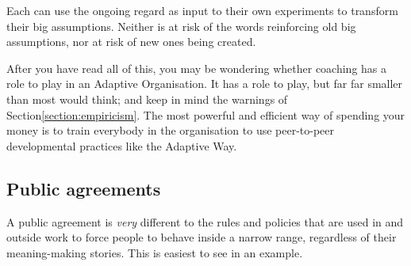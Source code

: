 Each can use the ongoing regard as input to their own experiments to transform their big assumptions. Neither is at risk of the words reinforcing old big assumptions, nor at risk of new ones being created. 


After you have read all of this, you may be wondering whether coaching has a role to play in an Adaptive Organisation.  It has a role to play, but far far smaller than most would think; and keep in mind the warnings of Section\ref{section:empiricism}. The most powerful and efficient way of spending your money is to train everybody in the organisation to use peer-to-peer developmental practices like the Adaptive Way.


\subsection{Public agreements} 
\label{section:public-agreements}


A public agreement is \emph{very} different to the rules and policies that are used in and outside work to force people to behave inside a narrow range, regardless of their meaning\hyp{}making stories. This is easiest to see in an example.


